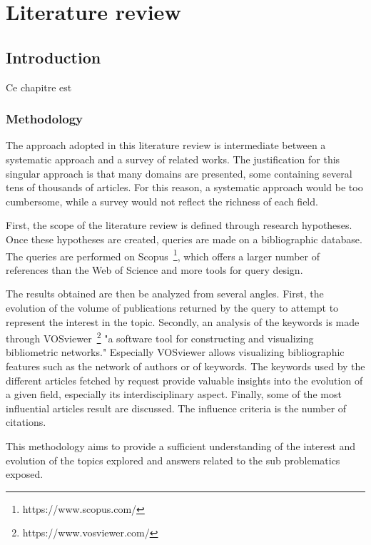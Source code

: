 \chapter{Literature review}

\section*{Introduction}
Ce chapitre est

\subsection*{Methodology}
The approach adopted in this literature review is intermediate between a systematic approach and a survey of related works.
The justification for this singular approach is that many domains are presented, some containing several tens of thousands of articles.
For this reason, a systematic approach would be too cumbersome, while a survey would not reflect the richness of each field.

First, the scope of the literature review is defined through research hypotheses.
Once these hypotheses are created, queries are made on a bibliographic database.
The queries are performed on Scopus~\footnote{https://www.scopus.com/}, which offers a larger number of references than the Web of Science and more tools for query design.

The results obtained are then be analyzed from several angles.
First, the evolution of the volume of publications returned by the query to attempt to represent the interest in the topic.
Secondly, an analysis of the keywords is made through VOSviewer~\footnote{https://www.vosviewer.com/} "a software tool for constructing and visualizing bibliometric networks."
Especially VOSviewer allows visualizing bibliographic features such as the network of authors or of keywords.
The keywords used by the different articles fetched by request provide valuable insights into the evolution of a given field, especially its interdisciplinary aspect.
Finally, some of the most influential articles result are discussed.
The influence criteria is the number of citations.

This methodology aims to provide a sufficient understanding of the interest and evolution of the topics explored and answers related to the sub problematics exposed.

